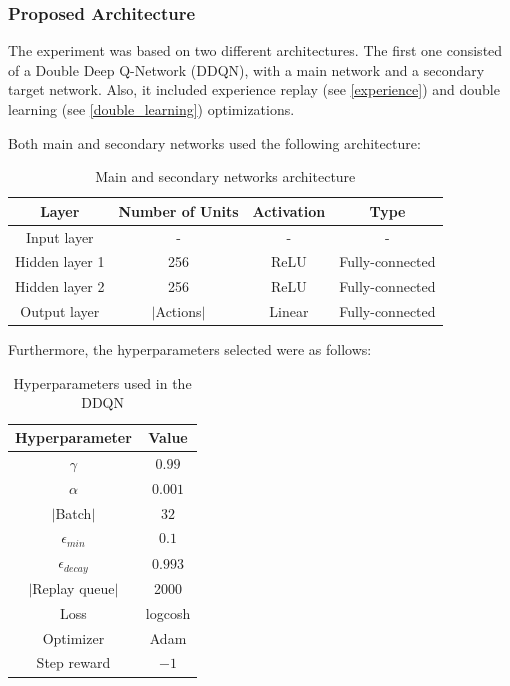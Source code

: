 \documentclass[11pt,twoside]{article}
\begin{document}
\subsubsection{Proposed Architecture}\label{arch}

The experiment was based on two different architectures. The first one consisted of a Double Deep Q-Network (DDQN), with a main network and a secondary target network. Also, it included experience replay (see \ref{experience}) and double learning (see \ref{double_learning}) optimizations.

Both main and secondary networks used the following architecture:

\begin{table}[H]
	\begin{center}
		\begin{tabular}{|c|c|c|c|} 
			\hline
			Layer & Number of Units & Activation & Type \\
			\hline\hline
			Input layer & - & - & - \\ 
			\hline
			Hidden layer 1 & 256 & ReLU & Fully-connected\\
			\hline
			Hidden layer 2 & 256 & ReLU & Fully-connected\\
			\hline
			Output layer & $|$Actions$|$ & Linear & Fully-connected\\
			\hline
		\end{tabular}
		\caption{Main and secondary networks architecture}
	\end{center}
\end{table}

Furthermore, the hyperparameters selected were as follows:

\begin{table}[H]
	\begin{center}
		\begin{tabular}{|c |c|} 
			\hline
			Hyperparameter & Value \\
			\hline\hline
			$\gamma$ & $0.99$ \\
			$\alpha$ & $0.001$ \\
			$|$Batch$|$ & $32$ \\
			$\epsilon_{min}$ & $0.1$ \\
			$\epsilon_{decay}$ & $0.993$ \\
			$|$Replay queue$|$ & 2000 \\
			Loss & logcosh \\
			Optimizer & Adam \\
			Step reward & $-1$ \\
			\hline
		\end{tabular}
		\caption{Hyperparameters used in the DDQN}
	\end{center}
\end{table}
\end{document}
